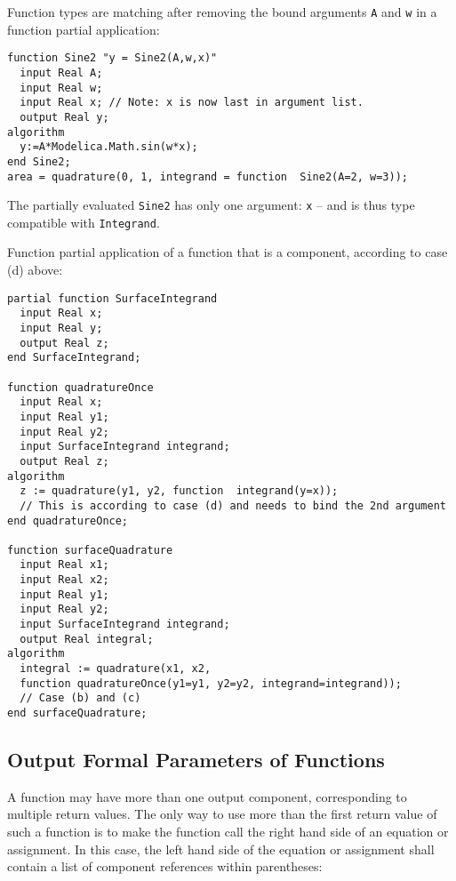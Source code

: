 \begin{example}
Function types are matching after removing the bound arguments \lstinline!A! and \lstinline!w! in a function partial
application:
\begin{lstlisting}[language=modelica]
function Sine2 "y = Sine2(A,w,x)"
  input Real A;
  input Real w;
  input Real x; // Note: x is now last in argument list.
  output Real y;
algorithm
  y:=A*Modelica.Math.sin(w*x);
end Sine2;
area = quadrature(0, 1, integrand = function  Sine2(A=2, w=3));
\end{lstlisting}
The partially evaluated \lstinline!Sine2! has only one argument: \lstinline!x! -- and is thus type compatible with \lstinline!Integrand!.
\end{example}

\begin{example}
Function partial application of a function that is a component, according to case (d) above:
\begin{lstlisting}[language=modelica]
partial function SurfaceIntegrand
  input Real x;
  input Real y;
  output Real z;
end SurfaceIntegrand;

function quadratureOnce
  input Real x;
  input Real y1;
  input Real y2;
  input SurfaceIntegrand integrand;
  output Real z;
algorithm
  z := quadrature(y1, y2, function  integrand(y=x));
  // This is according to case (d) and needs to bind the 2nd argument
end quadratureOnce;

function surfaceQuadrature
  input Real x1;
  input Real x2;
  input Real y1;
  input Real y2;
  input SurfaceIntegrand integrand;
  output Real integral;
algorithm
  integral := quadrature(x1, x2,
  function quadratureOnce(y1=y1, y2=y2, integrand=integrand));
  // Case (b) and (c)
end surfaceQuadrature;
\end{lstlisting}
\end{example}

\subsection{Output Formal Parameters of Functions}\label{output-formal-parameters-of-functions}

A function may have more than one output component, corresponding to
multiple return values. The only way to use more than the first return
value of such a function is to make the function call the right hand
side of an equation or assignment. In this case, the left hand side of
the equation or assignment shall contain a list of component references
within parentheses:

